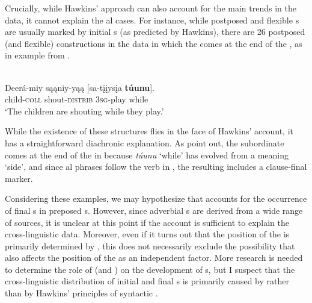 \documentclass[output=paper]{langsci/langscibook}
\begin{document}
Crucially, while Hawkins’  approach can also account for the main trends in the data, it cannot explain the al cases. For instance, while postposed and flexible s are usually marked by initial s (as predicted by Hawkins), there are 26 postposed (and flexible)  constructions in the data in which the  comes at the end of the , as in example  from .

\ea\label{ex:diessel:21}
\\
\gll   Deerá-miy  sąąniy-yąą  [sa-tįįysįa  \textbf{túunu}].\\
       child-\textsc{coll}  shout-\textsc{distrib}  3\textsc{sg}-play  while\\
\glt   `The children are shouting while they play.'
\z

\noindent While the existence of these structures flies in the face of Hawkins’  account, it has a straightforward diachronic explanation. As \citet[340]{PaynePayne1990} point out, the subordinate  comes at the end of the  in  because \textit{túunu} ‘while’ has evolved from a  meaning ‘side’, and since al phrases follow the verb in , the resulting  includes a clause-final marker.\label{p:diessel:exception}

Considering these examples, we may hypothesize that  accounts for the occurrence of final s in preposed s. However, since adverbial s are derived from a wide range of sources, it is unclear at this point if the  account is sufficient to explain the cross-linguistic data. Moreover, even if it turns out that the position of the  is primarily determined by , this does not necessarily exclude the possibility that  also affects the position of the  as an independent factor. More research is needed to determine the role of  (and ) on the development of s, but I suspect that the cross-linguistic distribution of initial and final s is primarily caused by  rather than by Hawkins’ principles of syntactic .
\end{document}
